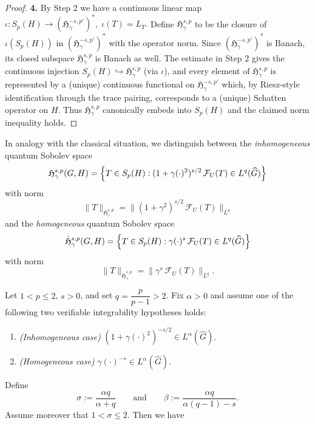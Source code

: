 \documentclass[11pt,a4paper]{article}
\theoremstyle{definition}
\begin{document}
\begin{proof}
\medskip\noindent\textbf{4.}
By Step 2 we have a continuous linear map
\(\iota: S_p(H)\to (\mathfrak{H}^{-s,p'}_{\gamma})^*,\; \iota(T)=L_T.\)
Define \(\mathfrak{H}^{s,p}_{\gamma}\) to be the closure of \(\iota(S_p(H))\) in \((\mathfrak{H}^{-s,p'}_{\gamma})^*\)
with the operator norm. Since \((\mathfrak{H}^{-s,p'}_{\gamma})^*\) is Banach, its closed subspace
\(\mathfrak{H}^{s,p}_{\gamma}\) is Banach as well. The estimate in Step 2 gives the continuous
injection \(S_p(H)\hookrightarrow \mathfrak{H}^{s,p}_{\gamma}\) (via $\iota$), and every element of
$\mathfrak{H}^{s,p}_{\gamma}$ is represented by a (unique) continuous functional on $\mathfrak{H}^{-s,p'}_{\gamma}$
which, by Riesz-style identification through the trace pairing, corresponds to a (unique)
Schatten operator on $H$. Thus $\mathfrak{H}^{s,p}_{\gamma}$ canonically embeds into $S_p(H)$ and the
claimed norm inequality holds.
\end{proof}




In analogy with the classical situation, we distinguish between the
\emph{inhomogeneous} quantum Sobolev space
\[
\mathfrak{H}^{s,p}_\gamma(G,H)
= \Bigl\{ T\in S_p(H): (1+\gamma(\cdot)^2)^{s/2} \,\mathcal{F}_U(T)\in L^q(\widehat G)\Bigr\}
\]
with norm
\[
\|T\|_{\mathfrak{H}^{s,p}_\gamma}
= \|(1+\gamma^2)^{s/2}\,\mathcal{F}_U(T)\|_{L^q}
\]
and the \emph{homogeneous} quantum Sobolev space
\[
\dot{\mathfrak{H}}^{s,p}_\gamma(G,H)
= \Bigl\{ T\in S_p(H): \gamma(\cdot)^s \,\mathcal{F}_U(T)\in L^q(\widehat G)\Bigr\}
\]
with norm
\[
\|T\|_{\dot{\mathfrak{H}}^{s,p}_\gamma}
= \|\gamma^s\,\mathcal{F}_U(T)\|_{L^q}.
\]




Let $1<p\le2$, $s>0$, and set $q=\dfrac{p}{p-1}>2$.  Fix $\alpha>0$ and assume one of the following
two verifiable integrability hypotheses holds:
\begin{enumerate}
\item\emph{(Inhomogeneous case)} \quad $(1+\gamma(\cdot)^2)^{-s/2}\in L^\alpha(\widehat G)$.
\item\emph{(Homogeneous case)} \quad $\gamma(\cdot)^{-s}\in L^\alpha(\widehat G)$.
\end{enumerate}

Define
\[
\sigma:=\frac{\alpha q}{\alpha+q}\qquad\text{and}\qquad
\beta:=\frac{\alpha q}{\alpha(q-1)-s}.
\]
Assume moreover that $1<\sigma\le 2$. Then we have
\end{document}
